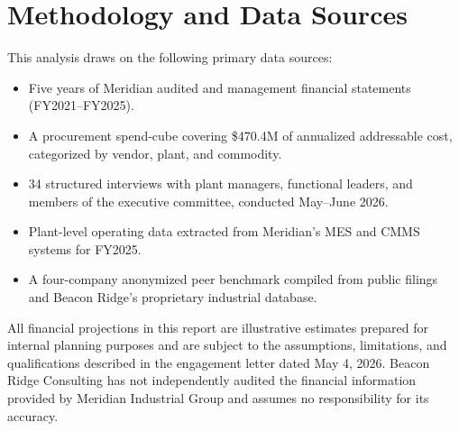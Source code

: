 \section{Methodology and Data Sources}

This analysis draws on the following primary data sources:

\begin{itemize}
\item Five years of Meridian audited and management financial statements (FY2021--FY2025).
\item A procurement spend-cube covering \$470.4M of annualized addressable cost, categorized by vendor, plant, and commodity.
\item 34 structured interviews with plant managers, functional leaders, and members of the executive committee, conducted May--June 2026.
\item Plant-level operating data extracted from Meridian's MES and CMMS systems for FY2025.
\item A four-company anonymized peer benchmark compiled from public filings and Beacon Ridge's proprietary industrial database.
\end{itemize}

All financial projections in this report are illustrative estimates prepared for internal planning purposes and are subject to the assumptions, limitations, and qualifications described in the engagement letter dated May 4, 2026. Beacon Ridge Consulting has not independently audited the financial information provided by Meridian Industrial Group and assumes no responsibility for its accuracy.
